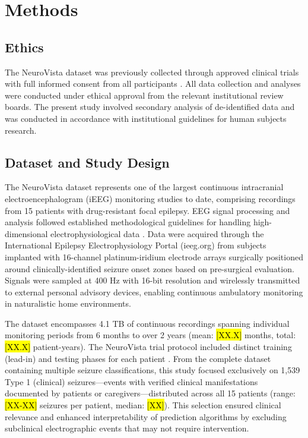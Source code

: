 

\section{Methods}

\subsection{Ethics}
The NeuroVista dataset was previously collected through approved clinical trials with full informed consent from all participants \cite{Kuhlmann2018SeizurePA}. All data collection and analyses were conducted under ethical approval from the relevant institutional review boards. The present study involved secondary analysis of de-identified data and was conducted in accordance with institutional guidelines for human subjects research.

\subsection{Dataset and Study Design}
The NeuroVista dataset \cite{Kuhlmann2018SeizurePA} represents one of the largest continuous intracranial electroencephalogram (iEEG) monitoring studies to date, comprising recordings from 15 patients with drug-resistant focal epilepsy. EEG signal processing and analysis followed established methodological guidelines for handling high-dimensional electrophysiological data \cite{Cox2020AnalyzingHSO}. Data were acquired through the International Epilepsy Electrophysiology Portal (ieeg.org) from subjects implanted with 16-channel platinum-iridium electrode arrays surgically positioned around clinically-identified seizure onset zones based on pre-surgical evaluation. Signals were sampled at 400 Hz with 16-bit resolution and wirelessly transmitted to external personal advisory devices, enabling continuous ambulatory monitoring in naturalistic home environments.

The dataset encompasses 4.1 TB of continuous recordings spanning individual monitoring periods from 6 months to over 2 years (mean: \hl{[XX.X]} months, total: \hl{[XX.X]} patient-years). The NeuroVista trial protocol included distinct training (lead-in) and testing phases for each patient \cite{Freestone2015SeizurePSBF}. From the complete dataset containing multiple seizure classifications, this study focused exclusively on 1,539 Type 1 (clinical) seizures—events with verified clinical manifestations documented by patients or caregivers—distributed across all 15 patients (range: \hl{[XX-XX]} seizures per patient, median: \hl{[XX]}). This selection ensured clinical relevance and enhanced interpretability of prediction algorithms by excluding subclinical electrographic events that may not require intervention.

